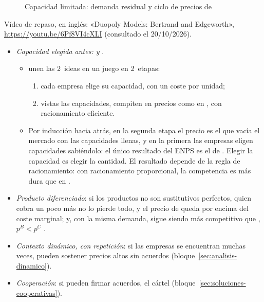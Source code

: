 \documentclass[11pt]{article}
\begin{document}
\begin{figure}[H]
\centering
\caption{Capacidad limitada: demanda residual y ciclo de precios de }\label{fig:edgeworth}
\end{figure}

\begin{anotaciones}
Vídeo de repaso, en inglés: «Duopoly Models: Bertrand and Edgeworth», \url{https://youtu.be/6Pf8VI4cXLI} (consultado el 20/10/2026).
\end{anotaciones}

\begin{itemize}
\item \emph{Capacidad elegida antes:  y }.
  \begin{itemize}
  \item \textcite{KrepsScheinkman1983Quantity} unen las 2~ideas en un juego en 2~etapas:
    \begin{enumerate}
    \item cada empresa elige su capacidad, con un coste por unidad;
    \item vistas las capacidades, compiten en precios como en , con racionamiento eficiente.
    \end{enumerate}
  \item Por inducción hacia atrás, en la segunda etapa el precio es el que vacía el mercado con las capacidades llenas, y en la primera las empresas eligen capacidades sabiéndolo: el único resultado del ENPS es el de . Elegir la capacidad es elegir la cantidad. El resultado depende de la regla de racionamiento: con racionamiento proporcional, la competencia es más dura que en \nocite{DavidsonDeneckere1986Long}.
  \end{itemize}
\item \emph{Producto diferenciado}: si los productos no son sustitutivos perfectos, quien cobra un poco más no lo pierde todo, y el precio de  queda por encima del coste marginal; y, con la misma demanda,  sigue siendo más competitivo que , $p^B<p^C$\nocite{SinghVives1984Price} .
\item \emph{Contexto dinámico, con repetición}: si las empresas se encuentran muchas veces, pueden sostener precios altos sin acuerdos (bloque~\ref{sec:analisis-dinamico}).
\item \emph{Cooperación}: si pueden firmar acuerdos, el cártel (bloque~\ref{sec:soluciones-cooperativas}).
\end{itemize}
\end{document}
